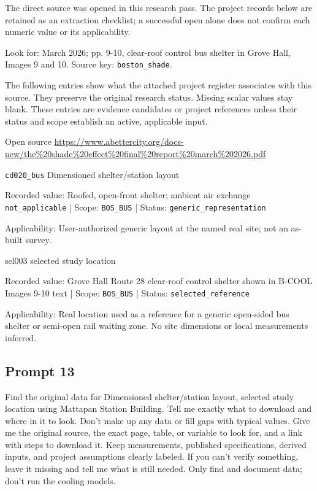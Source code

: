 The direct source was opened in this research pass. The project records below are retained as an extraction checklist; a successful open alone does not confirm each numeric value or its applicability.

Look for: March 2026; pp. 9-10, clear-roof control bus shelter in Grove Hall, Images 9 and 10. Source key: \nolinkurl{boston_shade}.

The following entries show what the attached project register associates with this source. They preserve the original research status. Missing scalar values stay blank. These entries are evidence candidates or project references unless their status and scope establish an active, applicable input.

Open source  \url{https://www.abettercity.org/docs-new/the%20shade%20effect%20final%20report%20march%202026.pdf}

\nolinkurl{cd020_bus}  Dimensioned shelter/station layout

Recorded value: Roofed, open-front shelter; ambient air exchange \nolinkurl{not_applicable} | Scope: \nolinkurl{BOS_BUS} | Status: \nolinkurl{generic_representation}

Applicability: User-authorized generic layout at the named real site; not an as-built survey.

sel003  selected study location

Recorded value: Grove Hall Route 28 clear-roof control shelter shown in B-COOL Images 9-10 text | Scope: \nolinkurl{BOS_BUS} | Status: \nolinkurl{selected_reference}

Applicability: Real location used as a reference for a generic open-sided bus shelter or semi-open rail waiting zone. No site dimensions or local measurements inferred.

\subsection*{Prompt 13}
Find the original data for Dimensioned shelter/station layout, selected study location using Mattapan Station Building. Tell me exactly what to download and where in it to look. Don’t make up any data or fill gaps with typical values. Give me the original source, the exact page, table, or variable to look for, and a link with steps to download it. Keep measurements, published specifications, derived inputs, and project assumptions clearly labeled. If you can’t verify something, leave it missing and tell me what is still needed. Only find and document data; don’t run the cooling models.

